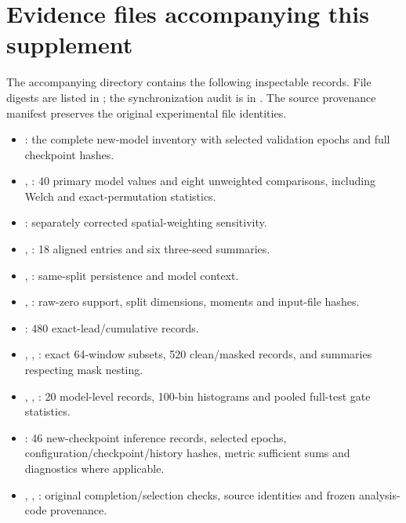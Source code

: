 \documentclass[10pt,a4paper]{article}
\begin{document}
\section{Evidence files accompanying this supplement}
The accompanying  directory contains the following inspectable records. File digests are listed in ; the synchronization audit is in . The source provenance manifest preserves the original experimental file identities.
\begin{itemize}
\item {}: the complete new-model inventory with selected validation epochs and full checkpoint hashes.
\item {}, : 40 primary model values and eight unweighted comparisons, including Welch and exact-permutation statistics.
\item {}: separately corrected spatial-weighting sensitivity.
\item {}, : 18 aligned entries and six three-seed summaries.
\item {}, : same-split persistence and model context.
\item {}, : raw-zero support, split dimensions, moments and input-file hashes.
\item {}: 480 exact-lead/cumulative records.
\item {}, , : exact 64-window subsets, 520 clean/masked records, and summaries respecting mask nesting.
\item {}, , : 20 model-level records, 100-bin histograms and pooled full-test gate statistics.
\item {}: 46 new-checkpoint inference records, selected epochs, configuration/checkpoint/history hashes, metric sufficient sums and diagnostics where applicable.
\item {}, , : original completion/selection checks, source identities and frozen analysis-code provenance.
\end{itemize}
\end{document}
